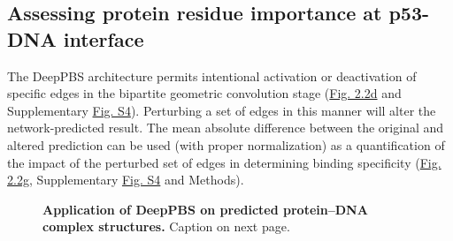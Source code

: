\subsection{Assessing protein residue importance at p53-DNA interface}
The DeepPBS architecture permits intentional activation or deactivation of specific edges in the bipartite geometric convolution stage (\hyperref[fig:pdna1]{Fig. 2.2d} and Supplementary \hyperref[fig:pdnaS4]{Fig. S4}). Perturbing a set of edges in this manner will alter the network-predicted result. The mean absolute difference between the original and altered prediction can be used (with proper normalization) as a quantification of the impact of the perturbed set of edges in determining binding specificity (\hyperref[fig:pdna1]{Fig. 2.2g}, Supplementary \hyperref[fig:pdnaS4]{Fig. S4} and Methods).
\begin{center}
    \begin{figure}[H]
        \caption[]{\textbf{Application of DeepPBS on predicted protein–DNA complex structures.} Caption on next page.}
  \label{fig:pdna3}
\end{figure}

\end{center}
